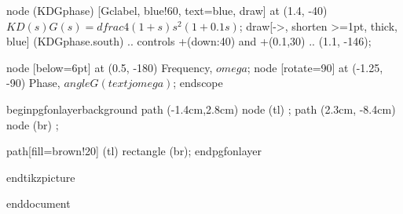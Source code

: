 node (KDGphase) [Gclabel, blue!60, text=blue, draw]
    at (1.4, -40) {$KD(s)G(s)=dfrac{4(1+s)}{s^2(1+0.1s)}$};
draw[->, shorten >=1pt, thick, blue] 
    (KDGphase.south) .. controls +(down:40) and +(0.1,30) .. (1.1, -146);

node [below=6pt] at (0.5, -180) {Frequency, $omega$};
node [rotate=90] at (-1.25, -90) {Phase, $angle G(text{j}omega)$};
end{scope}

begin{pgfonlayer}{background}
    path (-1.4cm,2.8cm) node (tl) {};
    path (2.3cm, -8.4cm) node (br) {};

    path[fill=brown!20] (tl) rectangle (br);
end{pgfonlayer}

end{tikzpicture}

end{document} 